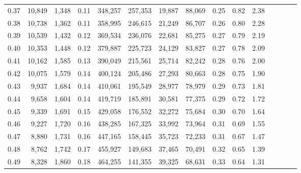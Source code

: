 \begin{tabular}{rrrcrrrrrrrrrrr}
0.37 &  10,849 &  1,348 &                                       0.11 &  348,257 &  257,353 &   19,887 &   88,069 &  0.25 &  0.82 &                         2.38 \\
0.38 &  10,738 &  1,362 &                                       0.11 &  358,995 &  246,615 &   21,249 &   86,707 &  0.26 &  0.80 &                         2.28 \\
0.39 &  10,539 &  1,432 &                                       0.12 &  369,534 &  236,076 &   22,681 &   85,275 &  0.27 &  0.79 &                         2.19 \\
0.40 &  10,353 &  1,448 &                                       0.12 &  379,887 &  225,723 &   24,129 &   83,827 &  0.27 &  0.78 &                         2.09 \\
0.41 &  10,162 &  1,585 &                                       0.13 &  390,049 &  215,561 &   25,714 &   82,242 &  0.28 &  0.76 &                         2.00 \\
0.42 &  10,075 &  1,579 &                                       0.14 &  400,124 &  205,486 &   27,293 &   80,663 &  0.28 &  0.75 &                         1.90 \\
0.43 &   9,937 &  1,684 &                                       0.14 &  410,061 &  195,549 &   28,977 &   78,979 &  0.29 &  0.73 &                         1.81 \\
0.44 &   9,658 &  1,604 &                                       0.14 &  419,719 &  185,891 &   30,581 &   77,375 &  0.29 &  0.72 &                         1.72 \\
0.45 &   9,339 &  1,691 &                                       0.15 &  429,058 &  176,552 &   32,272 &   75,684 &  0.30 &  0.70 &                         1.64 \\
0.46 &   9,227 &  1,720 &                                       0.16 &  438,285 &  167,325 &   33,992 &   73,964 &  0.31 &  0.69 &                         1.55 \\
0.47 &   8,880 &  1,731 &                                       0.16 &  447,165 &  158,445 &   35,723 &   72,233 &  0.31 &  0.67 &                         1.47 \\
0.48 &   8,762 &  1,742 &                                       0.17 &  455,927 &  149,683 &   37,465 &   70,491 &  0.32 &  0.65 &                         1.39 \\
0.49 &   8,328 &  1,860 &                                       0.18 &  464,255 &  141,355 &   39,325 &   68,631 &  0.33 &  0.64 &                         1.31 \\

\end{tabular}
